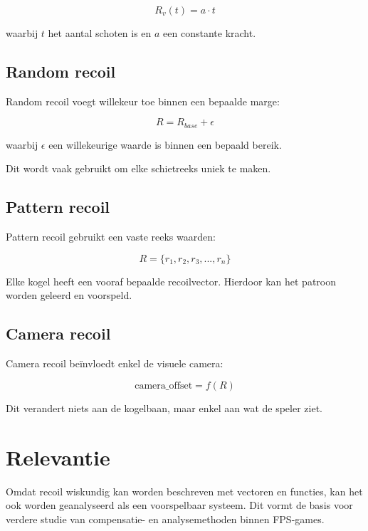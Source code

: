 \[
R_v(t) = a \cdot t
\]

waarbij $t$ het aantal schoten is en $a$ een constante kracht.

\subsection{Random recoil}

Random recoil voegt willekeur toe binnen een bepaalde marge:

\[
R = R_{base} + \epsilon
\]

waarbij $\epsilon$ een willekeurige waarde is binnen een bepaald bereik.

Dit wordt vaak gebruikt om elke schietreeks uniek te maken.

\subsection{Pattern recoil}

Pattern recoil gebruikt een vaste reeks waarden:

\[
R = \{r_1, r_2, r_3, ..., r_n\}
\]

Elke kogel heeft een vooraf bepaalde recoilvector. Hierdoor kan het patroon worden geleerd en voorspeld.

\subsection{Camera recoil}

Camera recoil beïnvloedt enkel de visuele camera:

\[
\text{camera\_offset} = f(R)
\]

Dit verandert niets aan de kogelbaan, maar enkel aan wat de speler ziet.

\section{Relevantie}

Omdat recoil wiskundig kan worden beschreven met vectoren en functies, kan het ook worden geanalyseerd als een voorspelbaar systeem. Dit vormt de basis voor verdere studie van compensatie- en analysemethoden binnen FPS-games.